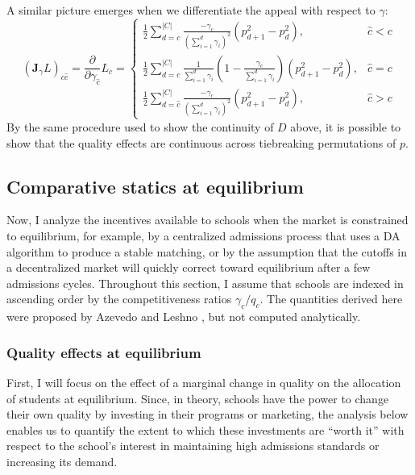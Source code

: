 \documentclass[12pt]{article}
\numberwithin{equation}{subsection}
\theoremstyle{definition}
\begin{document}
A similar picture emerges when we differentiate the appeal with respect to $\gamma$:
\begin{equation}
\left(\mathbf{J}_\gamma L \right)_{c\hat c} =
\frac{\partial}{\partial\gamma_{\hat c}} L_c = \begin{cases}
\frac{1}{2}\sum_{d=c}^{|C|} \frac{-\gamma_c}{\left(\sum_{i=1}^{d}\gamma_i \right)^2} \left(p_{d+1}^2 - p_d^2 \right), & \hat c < c \\
\frac{1}{2}\sum_{d=c}^{|C|} \frac{1}{\sum_{i=1}^{d} \gamma_i}
    \left( 1 - \frac{\gamma_c}{\sum_{i=1}^{d} \gamma_i}\right)
    \left(p_{d+1}^2 - p_d^2 \right), & \hat c = c\\
\frac{1}{2}\sum_{d=\hat c}^{|C|} \frac{-\gamma_c}{\left(\sum_{i=1}^{d} \gamma_i \right)^2} \left(p_{d+1}^2 - p_d^2 \right), & \hat c > c
\end{cases}\end{equation}
By the same procedure used to show the continuity of $D$ above, it is possible to show that the quality effects are continuous across tiebreaking permutations of $p$.





\subsection{Comparative statics at equilibrium} \label{compstateq}
Now, I analyze the incentives available to schools when the market is constrained to equilibrium, for example, by a centralized admissions process that uses a DA algorithm to produce a stable matching, or by the assumption that the cutoffs in a decentralized market will quickly correct toward equilibrium after a few admissions cycles. Throughout this section, I assume that schools are indexed in ascending order by the competitiveness ratios $\gamma_c / q_c$. The quantities derived here were proposed by Azevedo and Leshno \parencite*{supplydemandfw}, but not computed analytically.

\subsubsection{Quality effects at equilibrium} \label{qualityeffectsateq}
First, I will focus on the effect of a marginal change in quality on the allocation of students at equilibrium. Since, in theory, schools have the power to change their own quality by investing in their programs or marketing, the analysis below enables us to quantify the extent to which these investments are ``worth it'' with respect to the school's interest in maintaining high admissions standards or increasing its demand. 
\end{document}
